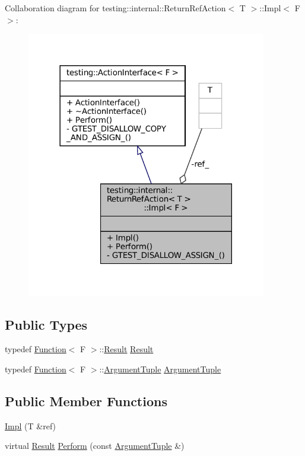 Collaboration diagram for testing\+:\+:internal\+:\+:Return\+Ref\+Action$<$ T $>$\+:\+:Impl$<$ F $>$\+:
\nopagebreak
\begin{figure}[H]
\begin{center}
\leavevmode
\includegraphics[width=297pt]{classtesting_1_1internal_1_1ReturnRefAction_1_1Impl__coll__graph}
\end{center}
\end{figure}
\subsection*{Public Types}
\begin{DoxyCompactItemize}
\item 
typedef \hyperlink{structtesting_1_1internal_1_1Function}{Function}$<$ F $>$\+::\hyperlink{classtesting_1_1ActionInterface_a7477de2fe3e4e01c59db698203acaee7}{Result} \hyperlink{classtesting_1_1internal_1_1ReturnRefAction_1_1Impl_a9d55719e344507c0579150cdf307c8bc}{Result}
\item 
typedef \hyperlink{structtesting_1_1internal_1_1Function}{Function}$<$ F $>$\+::\hyperlink{classtesting_1_1ActionInterface_af72720d864da4d606629e83edc003511}{Argument\+Tuple} \hyperlink{classtesting_1_1internal_1_1ReturnRefAction_1_1Impl_a69311fc7b75aba0f2c444d6766c82a4a}{Argument\+Tuple}
\end{DoxyCompactItemize}
\subsection*{Public Member Functions}
\begin{DoxyCompactItemize}
\item 
\hyperlink{classtesting_1_1internal_1_1ReturnRefAction_1_1Impl_a245d797a18ba609ce99bc5a383d6c36f}{Impl} (T \&ref)
\item 
virtual \hyperlink{classtesting_1_1ActionInterface_a7477de2fe3e4e01c59db698203acaee7}{Result} \hyperlink{classtesting_1_1internal_1_1ReturnRefAction_1_1Impl_ae65024d38782cd53a194346ace6ed9af}{Perform} (const \hyperlink{classtesting_1_1ActionInterface_af72720d864da4d606629e83edc003511}{Argument\+Tuple} \&)
\end{DoxyCompactItemize}
